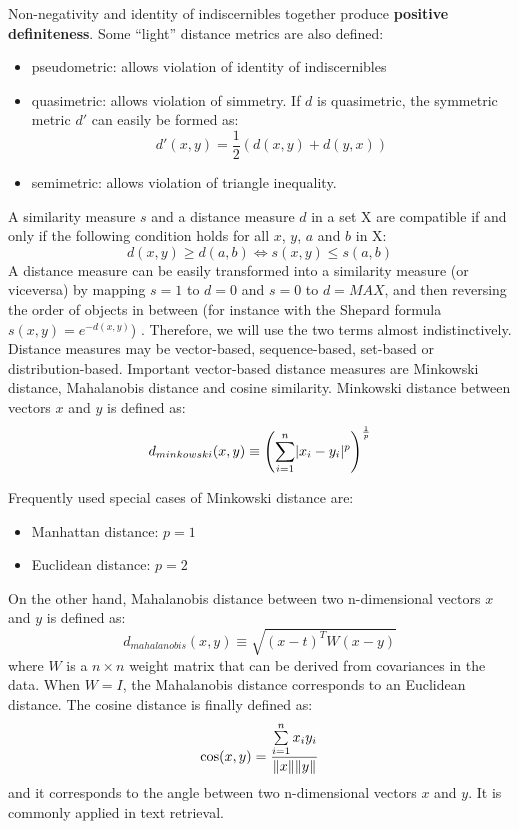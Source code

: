 Non-negativity and identity of indiscernibles together produce \textbf{positive definiteness}.
Some ``light'' distance metrics are also defined:
\begin{itemize}
\item pseudometric: allows violation of identity of indiscernibles
\item quasimetric: allows violation of simmetry. If $d$ is quasimetric, the symmetric metric $d'$ can easily be formed as:
\begin{equation}
d'(x,y) = \frac{1}{2}(d(x,y) + d(y,x))
\end{equation}
\item semimetric: allows violation of triangle inequality.
\end{itemize}
A similarity measure $s$ and a distance measure $d$ in a set X are compatible if and only if the following condition holds for all $x$, $y$, $a$ and $b$ in X:
\begin{equation}
d(x,y) \geq d(a,b) \Leftrightarrow s(x,y) \leq s(a,b)
\end{equation}
A distance measure can be easily transformed into a similarity measure (or viceversa) by mapping $s=1$ to $d=0$ and $s=0$ to $d=MAX$, and then reversing the order of objects in between (for instance with the Shepard formula $s(x,y) = e^{-d(x,y)}$) \cite{stober11}. Therefore, we will use the two terms almost indistinctively.\\
Distance measures may be vector-based, sequence-based, set-based or distribution-based. Important vector-based distance measures are Minkowski distance, Mahalanobis distance and cosine similarity. Minkowski distance between vectors $x$ and $y$ is defined as:
\begin{equation}
d_{minkowski}(x,y) \equiv \left( \sum\limits_{i=1}^{n} \lvert x_i - y_i\rvert^p \right)^{\frac{1}{p}}
\end{equation}

Frequently used special cases of Minkowski distance are:
\begin{itemize}
\item Manhattan distance: $p=1$
\item Euclidean distance: $p=2$
\end{itemize}


On the other hand, Mahalanobis distance between two n-dimensional vectors $x$ and $y$ is defined as:
\begin{equation}
d_{mahalanobis}(x,y) \equiv \sqrt{(x-t)^{T}W(x-y)}
\end{equation}
where $W$ is a $n \times n$ weight matrix that can be derived from covariances in the data. When $W = I$, the Mahalanobis distance corresponds to an Euclidean distance.
The cosine distance is finally defined as:
\begin{equation}
\cos(x,y) = \frac{\sum\limits_{i=1}^{n} x_iy_i}{\lVert x\rVert\lVert y\rVert}
\end{equation}
and it corresponds to the angle between two n-dimensional vectors $x$ and $y$. It is commonly applied in text retrieval.\\

